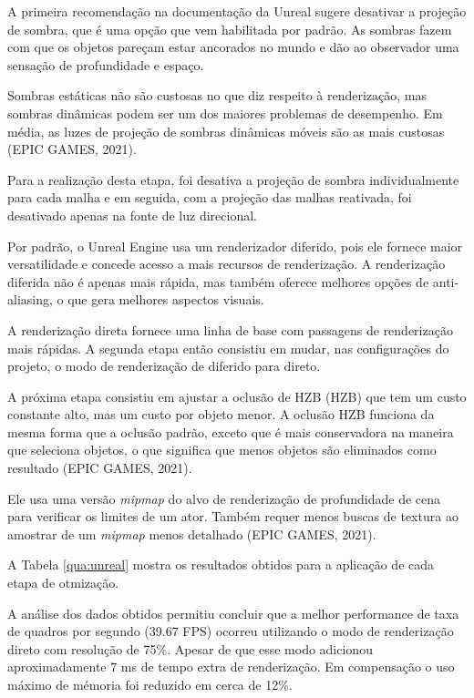A primeira recomendação na documentação da Unreal sugere desativar a projeção de sombra, que é uma opção que vem habilitada por padrão. As sombras fazem com que os objetos pareçam estar ancorados no mundo e dão ao observador uma sensação de profundidade e espaço. 

Sombras estáticas não são custosas no que diz respeito à renderização, mas sombras dinâmicas podem ser um dos maiores problemas de desempenho. Em média, as luzes de projeção de sombras dinâmicas móveis são as mais custosas (EPIC GAMES, 2021).

Para a realização desta etapa, foi desativa a projeção de sombra individualmente para cada malha e em seguida, com a projeção das malhas reativada, foi desativado apenas na fonte de luz direcional.

Por padrão, o Unreal Engine usa um renderizador diferido, pois ele fornece maior versatilidade e concede acesso a mais recursos de renderização. A renderização diferida não é apenas mais rápida, mas também oferece melhores opções de anti-aliasing, o que gera melhores aspectos visuais.

A renderização direta fornece uma linha de base com passagens de renderização mais rápidas. A segunda etapa então consistiu em mudar, nas configurações do projeto, o modo de renderização de diferido para direto.

A próxima etapa consistiu em ajustar a oclusão de HZB (\acrlong{HZB}) que tem um custo constante alto, mas um custo por objeto menor. A oclusão HZB funciona da mesma forma que a oclusão padrão, exceto que é mais conservadora na maneira que seleciona objetos, o que significa que menos objetos são eliminados como resultado (EPIC GAMES, 2021). 

Ele usa uma versão \textit{mipmap} do alvo de renderização de profundidade de cena para verificar os limites de um ator. Também requer menos buscas de textura ao amostrar de um \textit{mipmap} menos detalhado (EPIC GAMES, 2021)\nocite{unrealdocs}.

A Tabela \ref{qua:unreal} mostra os resultados obtidos para a aplicação de cada etapa de otmização.



A análise dos dados obtidos permitiu concluir que a melhor performance de taxa de quadros por segundo (39.67 FPS) ocorreu utilizando o modo de renderização direto com resolução de 75\%. Apesar de que esse modo adicionou aproximadamente 7 ms de tempo extra de renderização. Em compensação o uso máximo de mémoria foi reduzido em cerca de 12\%.

